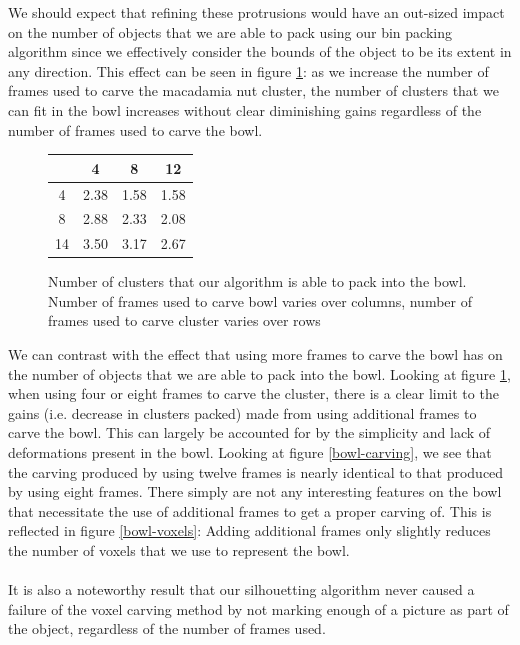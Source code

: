 \documentclass[10pt,twocolumn,letterpaper]{article}
\begin{document}
We should expect that refining these protrusions would have an out-sized impact on the number of objects that we are able to pack using our bin packing algorithm since we effectively consider the bounds of the object to be its extent in any direction. This effect can be seen in figure \ref{conts-objs}: as we increase the number of frames used to carve the macadamia nut cluster, the number of clusters that we can fit in the bowl increases without clear diminishing gains regardless of the number of frames used to carve the bowl.

\begin{figure}[H]
    \centering
    \begin{tabular}{|c|ccc|}
        \hline
           & 4    & 8    & 12 \\
        \hline
        4  & 2.38 & 1.58 & 1.58 \\
        8  & 2.88 & 2.33 & 2.08 \\
        14 & 3.50 & 3.17 & 2.67 \\
        \hline
    \end{tabular}
    \caption{Number of clusters that our algorithm is able to pack into the bowl. Number of frames used to carve bowl varies over columns, number of frames used to carve cluster varies over rows}
    \label{conts-objs}
\end{figure}

We can contrast with the effect that using more frames to carve the bowl has on the number of objects that we are able to pack into the bowl. Looking at figure \ref{conts-objs}, when using four or eight frames to carve the cluster, there is a clear limit to the gains (i.e. decrease in clusters packed) made from using additional frames to carve the bowl. This can largely be accounted for by the simplicity and lack of deformations present in the bowl. Looking at figure \ref{bowl-carving}, we see that the carving produced by using twelve frames is nearly identical to that produced by using eight frames. There simply are not any interesting features on the bowl that necessitate the use of additional frames to get a proper carving of. This is reflected in figure \ref{bowl-voxels}: Adding additional frames only slightly reduces the number of voxels that we use to represent the bowl. \\
\\It is also a noteworthy result that our silhouetting algorithm never caused a failure of the voxel carving method by not marking enough of a picture as part of the object, regardless of the number of frames used.
\end{document}
